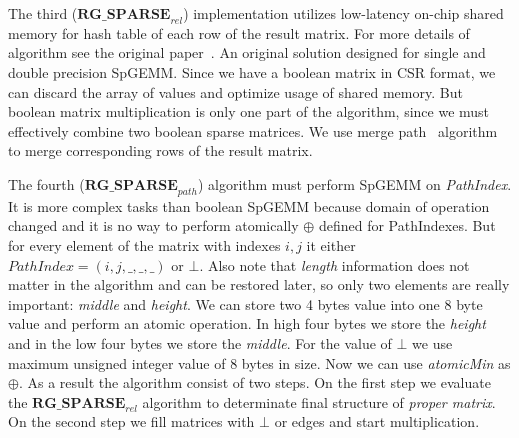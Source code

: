 The third ($\textbf{RG\_SPARSE}_{rel}$) implementation utilizes low-latency on-chip shared memory for hash table of each row of the result matrix. For more details of algorithm see the original paper~\cite{NsparsePaper}. An original solution designed for single and double precision SpGEMM. Since we have a boolean matrix in CSR format, we can discard the array of values and optimize usage of shared memory. But boolean matrix multiplication is only one part of the algorithm, since we must effectively combine two boolean sparse matrices. We use merge path~\cite{GpuMergePathPaper} algorithm to merge corresponding rows of the result matrix.

The fourth ($\textbf{RG\_SPARSE}_{path}$) algorithm must perform SpGEMM on \textit{PathIndex}. It is more complex tasks than boolean SpGEMM because domain of operation changed and it is no way to perform atomically $\oplus$ defined for PathIndexes. But for every element of the matrix with indexes $i,j$ it either $PathIndex = (i,j,\_,\_,\_)$ or $\bot$. Also note that \textit{length} information does not matter in the algorithm and can be restored later, so only two elements are really important: \textit{middle} and \textit{height}. We can store two 4 bytes value into one 8 byte value and perform an atomic operation. In high four bytes we store the \textit{height} and in the low four bytes we store the \textit{middle}. For the value of $\bot$ we use maximum unsigned integer value of 8 bytes in size. Now we can use \textit{atomicMin} as $\oplus$. As a result the algorithm consist of two steps. On the first step we evaluate the $\textbf{RG\_SPARSE}_{rel}$ algorithm to determinate final structure of \textit{proper matrix}. On the second step we fill matrices with $\bot$ or edges and start multiplication.
